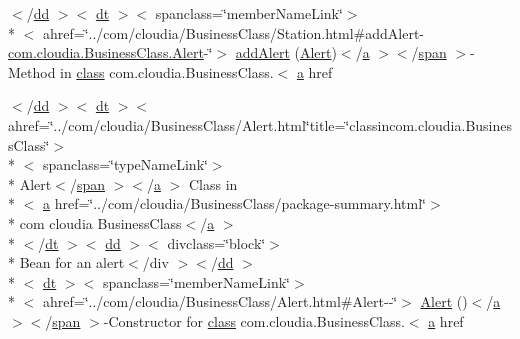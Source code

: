 \begin{DoxyCompactItemize}
\item 
$<$/\hyperlink{stylesheet_8css_a47f4718a86835a7771ec592ece845221}{dd} $>$$<$ \hyperlink{stylesheet_8css_a107565fb4039d33b041380d6e0ea1d80}{dt} $>$$<$ spanclass=\char`\"{}member\-Name\-Link\char`\"{}$>$\\*
$<$ ahref=\char`\"{}../com/cloudia/Business\-Class/Station.\-html\#add\-Alert-\/\hyperlink{index-1_8html_afe3a1cf8e65b0946ddd29a67b4e60a3a}{com.\-cloudia.\-Business\-Class.\-Alert}-\/\char`\"{}$>$ \hyperlink{index-1_8html_acc8a8391ef6c825d3633a17cb4e1f0aa}{add\-Alert} (\hyperlink{index-1_8html_afe3a1cf8e65b0946ddd29a67b4e60a3a}{Alert})$<$/\hyperlink{style_8css_a5e8981582017bb8b84c21f148345d1f7}{a} $>$$<$/\hyperlink{stylesheet_8css_a8343996ebcf16220b04e54659aac31cc}{span} $>$-\/Method in \hyperlink{_tools_8html_acf06f836132665ba8114f5a414c2403f}{class} com.\-cloudia.\-Business\-Class.$<$ \hyperlink{style_8css_a5e8981582017bb8b84c21f148345d1f7}{a} href
\item 
$<$/\hyperlink{stylesheet_8css_a47f4718a86835a7771ec592ece845221}{dd} $>$$<$ \hyperlink{stylesheet_8css_a107565fb4039d33b041380d6e0ea1d80}{dt} $>$$<$ ahref=\char`\"{}../com/cloudia/Business\-Class/Alert.\-html\char`\"{}title=\char`\"{}classincom.\-cloudia.\-Business\-Class\char`\"{}$>$\\*
$<$ spanclass=\char`\"{}type\-Name\-Link\char`\"{}$>$\\*
 Alert$<$/\hyperlink{stylesheet_8css_a8343996ebcf16220b04e54659aac31cc}{span} $>$$<$/\hyperlink{style_8css_a5e8981582017bb8b84c21f148345d1f7}{a} $>$ Class in\\*
$<$ \hyperlink{style_8css_a5e8981582017bb8b84c21f148345d1f7}{a} href=\char`\"{}../com/cloudia/Business\-Class/package-\/summary.\-html\char`\"{}$>$\\*
 com cloudia Business\-Class$<$/\hyperlink{style_8css_a5e8981582017bb8b84c21f148345d1f7}{a} $>$\\*
$<$/\hyperlink{stylesheet_8css_a107565fb4039d33b041380d6e0ea1d80}{dt} $>$$<$ \hyperlink{stylesheet_8css_a47f4718a86835a7771ec592ece845221}{dd} $>$$<$ divclass=\char`\"{}block\char`\"{}$>$\\*
 Bean for an alert$<$/div $>$$<$/\hyperlink{stylesheet_8css_a47f4718a86835a7771ec592ece845221}{dd} $>$\\*
$<$ \hyperlink{stylesheet_8css_a107565fb4039d33b041380d6e0ea1d80}{dt} $>$$<$ spanclass=\char`\"{}member\-Name\-Link\char`\"{}$>$\\*
$<$ ahref=\char`\"{}../com/cloudia/Business\-Class/Alert.\-html\#Alert-\/-\/\char`\"{}$>$ \hyperlink{index-1_8html_afe3a1cf8e65b0946ddd29a67b4e60a3a}{Alert} ()$<$/\hyperlink{style_8css_a5e8981582017bb8b84c21f148345d1f7}{a} $>$$<$/\hyperlink{stylesheet_8css_a8343996ebcf16220b04e54659aac31cc}{span} $>$-\/Constructor for \hyperlink{_tools_8html_acf06f836132665ba8114f5a414c2403f}{class} com.\-cloudia.\-Business\-Class.$<$ \hyperlink{style_8css_a5e8981582017bb8b84c21f148345d1f7}{a} href
$$
\end{DoxyCompactItemize}
